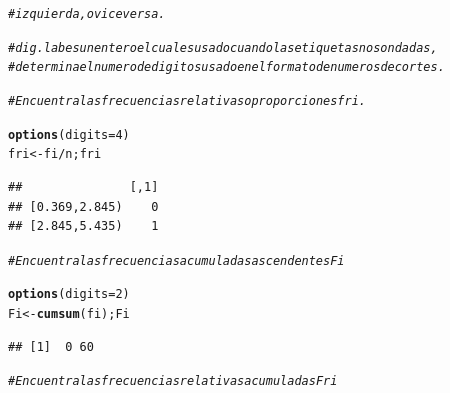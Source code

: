 \documentclass[12pt,letterpaper]{article}\usepackage[]{graphicx}\usepackage[]{color}
\makeatletter
\newcommand{\hlnum}[1]{\textcolor[rgb]{0.686,0.059,0.569}{#1}}%
\newcommand{\hlcom}[1]{\textcolor[rgb]{0.678,0.584,0.686}{\textit{#1}}}%
\newcommand{\hlopt}[1]{\textcolor[rgb]{0,0,0}{#1}}%
\newcommand{\hlstd}[1]{\textcolor[rgb]{0.345,0.345,0.345}{#1}}%
\newcommand{\hlkwb}[1]{\textcolor[rgb]{0.69,0.353,0.396}{#1}}%
\newcommand{\hlkwc}[1]{\textcolor[rgb]{0.333,0.667,0.333}{#1}}%
\newcommand{\hlkwd}[1]{\textcolor[rgb]{0.737,0.353,0.396}{\textbf{#1}}}%
\newenvironment{kframe}{%
 \def\at@end@of@kframe{}%
 \ifinner\ifhmode%
  \def\at@end@of@kframe{\end{minipage}}%
  \begin{minipage}{\columnwidth}%
 \fi\fi%
 \def\FrameCommand##1{\hskip\@totalleftmargin \hskip-\fboxsep
 \colorbox{shadecolor}{##1}\hskip-\fboxsep
     \hskip-\linewidth \hskip-\@totalleftmargin \hskip\columnwidth}%
 \MakeFramed {\advance\hsize-\width
   \@totalleftmargin\z@ \linewidth\hsize
   \@setminipage}}%
 {\par\unskip\endMakeFramed%
 \at@end@of@kframe}
\newenvironment{knitrout}{}{} %
\makeatother
\begin{document}
\begin{enumerate}
\begin{knitrout}
\begin{kframe}
\begin{alltt}
\hlcom{# izquierda, o viceversa. }
\end{alltt}
\end{kframe}
\end{knitrout}
\begin{knitrout}
\color{fgcolor}\begin{kframe}
\begin{alltt}
\hlcom{# dig.labes un entero el cual es usado cuando las etiquetas no son dadas,}
\hlcom{# determina el numero de digitos usado en el formato de numeros de cortes. }
\end{alltt}
\end{kframe}
\end{knitrout}

\begin{knitrout}
\color{fgcolor}\begin{kframe}
\begin{alltt}
\hlcom{# Encuentra las frecuencias relativas o proporciones fri.}

\hlkwd{options}\hlstd{(}\hlkwc{digits}\hlstd{=}\hlnum{4}\hlstd{)}
\hlstd{fri} \hlkwb{<-} \hlstd{fi}\hlopt{/}\hlstd{n; fri}
\end{alltt}
\begin{verbatim}
##               [,1]
## [0.369,2.845)    0
## [2.845,5.435)    1
\end{verbatim}
\end{kframe}
\end{knitrout}

\begin{knitrout}
\color{fgcolor}\begin{kframe}
\begin{alltt}
\hlcom{# Encuentra las frecuencias acumuladas ascendentes Fi}

\hlkwd{options}\hlstd{(}\hlkwc{digits}\hlstd{=}\hlnum{2}\hlstd{)}
\hlstd{Fi} \hlkwb{<-} \hlkwd{cumsum}\hlstd{(fi); Fi}
\end{alltt}
\begin{verbatim}
## [1]  0 60
\end{verbatim}
\end{kframe}
\end{knitrout}

\begin{knitrout}
\color{fgcolor}\begin{kframe}
\begin{alltt}
\hlcom{# Encuentra las frecuencias relativas acumuladas Fri}


\end{alltt}
\end{kframe}
\end{knitrout}
\end{enumerate}
\end{document}
